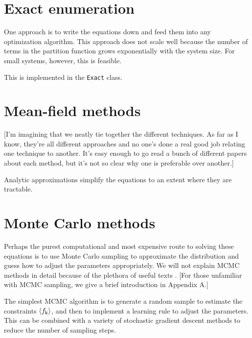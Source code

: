 \documentclass[aps,prl,twocolumn]{revtex4-1}
\begin{document}
\section{Exact enumeration}
One approach is to write the equations down and feed them into any optimization algorithm. This approach does not scale well because the number of terms in the partition function grows exponentially with the system size. For small systems, however, this is feasible.

This is implemented in the {\tt Exact} class.

\section{Mean-field methods}
[I'm imagining that we neatly tie together the different techniques. As far as I know, they're all different approaches and no one's done a real good job relating one technique to another. It's easy enough to go read a bunch of different papers about each method, but it's not so clear why one is preferable over another.]

Analytic approximations simplify the equations to an extent where they are tractable.

\section{Monte Carlo methods}


Perhaps the purest computational and most expensive route to solving these equations is to use Monte Carlo sampling to approximate the distribution and guess how to adjust the parameters appropriately. We will not explain MCMC methods in detail because of the plethora of useful texts \cite{MacKay:2005wc}. [For those unfamiliar with MCMC sampling, we give a brief introduction in Appendix A.]

The simplest MCMC algorithm is to generate a random sample to estimate the constraints $\left<f_{\rm k}\right>$, and then to implement a learning rule to adjust the parameters.
This can be combined with a variety of stochastic gradient descent methods to reduce the number of sampling steps.
\end{document}

